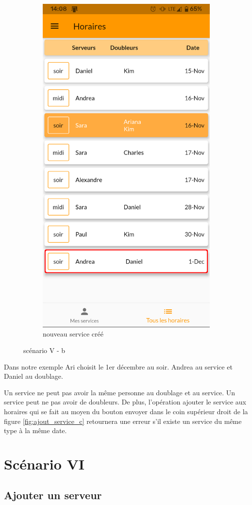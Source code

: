 \begin{figure}[!h]
\begin{subfigure}{.45\textwidth}
            \centering
            \includegraphics[width=0.6\linewidth]{screenshots/scenario_05/ajout_service_done.png}
            \caption{nouveau service créé}
            \label{fig:ajout_service_done}
        \end{subfigure}
        \caption{scénario V - b}
        \label{fig:scen05b}
    \end{figure}

    Dans notre exemple Ari choisit le 1er décembre au soir. Andrea au service et Daniel au doublage.

    Un service ne peut pas avoir la même personne au doublage et au service. Un service peut ne pas avoir
    de doubleurs. De plus, l'opération ajouter le service aux horaires qui se fait au moyen du bouton envoyer
    dans le coin supérieur droit de la figure \ref{fig:ajout_service_c} retournera une erreur s'il existe un 
    service du même type à la même date.

\section[Ajouter un serveur - Scénario VI]{Scénario VI}
    \subsection*{Ajouter un serveur}